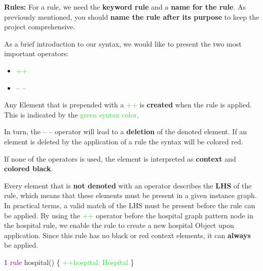 \textbf{Rules:}\newline
For a rule, we need the \textbf{keyword rule} and a \textbf{name for the rule}. As previously mentioned, you should \textbf{name the rule after its purpose} to keep the project comprehensive.\newline

As a brief introduction to our syntax, we would like to present the two most important operators:

\begin{itemize}
    \item \textcolor{LimeGreen}{++} 
    \item {\color{red} -- -- }
\end{itemize}
Any Element that is prepended with a \textcolor{LimeGreen}{ ++} is \textbf{created} when the rule is applied. This is indicated by the \textcolor{LimeGreen}{ green syntax color}.\newline

In turn, the {\color{red} -- -- } operator will lead to a \textbf{deletion} of the denoted element. If an element is deleted by the application of a rule the {\color{red}syntax will be colored red}. \newline

If none of the operators is used, the element is interpreted as \textbf{context} and \textbf{colored black}.\newline

Every element that is \textbf{not denoted} with an operator describes the \textbf{LHS} of the rule, which means that these elements must be present in a given instance graph.\newline
In practical terms, a valid match of the LHS must be present before the rule can be applied.\newline
By using the \textcolor{LimeGreen}{++} operator before the hospital graph pattern node in the hospital rule, we enable the rule to create a new hospital Object upon application. Since this rule has no black or red context elements, it can \textbf{always} be applied. \newline

{

1  \hspace{0.5cm}  \textcolor{Purple}{rule} hospital() \{  \hspace{1cm}  \textcolor{LimeGreen}{++hospital: Hospital}  \hspace{0.5cm}  \}\newline

}

